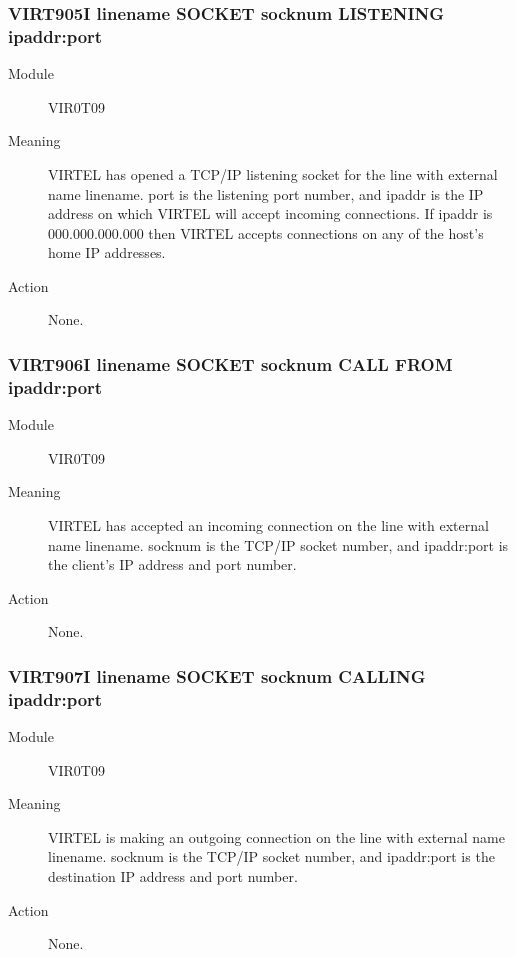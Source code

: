 \documentclass[letterpaper,10pt,english]{sphinxmanual}
\begin{document}
\subsubsection{VIRT905I linename SOCKET socknum LISTENING ipaddr:port}
\label{\detokenize{messages:virt905i-linename-socket-socknum-listening-ipaddr-port}}\begin{description}
\item[{Module}] \leavevmode
VIR0T09

\item[{Meaning}] \leavevmode
VIRTEL has opened a TCP/IP listening socket for the line with external name linename. port is the listening port number, and ipaddr is the IP address on which VIRTEL will accept incoming connections. If ipaddr is 000.000.000.000 then VIRTEL accepts connections on any of the host’s home IP addresses.

\item[{Action}] \leavevmode
None.

\end{description}


\subsubsection{VIRT906I linename SOCKET socknum CALL FROM ipaddr:port}
\label{\detokenize{messages:virt906i-linename-socket-socknum-call-from-ipaddr-port}}\begin{description}
\item[{Module}] \leavevmode
VIR0T09

\item[{Meaning}] \leavevmode
VIRTEL has accepted an incoming connection on the line with external name linename. socknum is the TCP/IP socket number, and ipaddr:port is the client’s IP address and port number.

\item[{Action}] \leavevmode
None.

\end{description}


\subsubsection{VIRT907I linename SOCKET socknum CALLING ipaddr:port}
\label{\detokenize{messages:virt907i-linename-socket-socknum-calling-ipaddr-port}}\begin{description}
\item[{Module}] \leavevmode
VIR0T09

\item[{Meaning}] \leavevmode
VIRTEL is making an outgoing connection on the line with external name linename. socknum is the TCP/IP socket number, and ipaddr:port is the destination IP address and port number.

\item[{Action}] \leavevmode
None.

\end{description}
\end{document}
